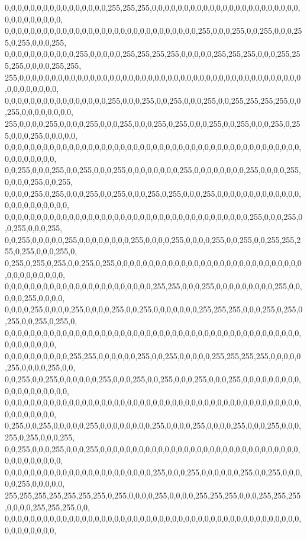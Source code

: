 \begin{DoxyCode}
      0,0,0,0,0,0,0,0,0,0,0,0,0,0,0,0,255,255,255,0,0,0,0,0,0,0,0,0,0,0,0,0,0,0,0,0,0,0,0,0,0,0,0,0,0,0,0,0,0,0,0,
      0,0,0,0,0,0,0,0,0,0,0,0,0,0,0,0,0,0,0,0,0,0,0,0,0,0,0,0,0,0,255,0,0,0,255,0,0,255,0,0,0,255,0,255,0,0,0,255,
      0,0,0,0,0,0,0,0,0,0,0,255,0,0,0,0,0,255,255,255,255,0,0,0,0,0,255,255,255,0,0,0,255,255,255,0,0,0,0,255,255,
      255,0,0,0,0,0,0,0,0,0,0,0,0,0,0,0,0,0,0,0,0,0,0,0,0,0,0,0,0,0,0,0,0,0,0,0,0,0,0,0,0,0,0,0,0,0,0,0,0,0,0,0,0,
      0,0,0,0,0,0,0,0,0,0,0,0,0,0,0,0,255,0,0,0,255,0,0,255,0,0,0,255,0,0,255,255,255,255,0,0,255,0,0,0,0,0,0,0,0,
      255,0,0,0,0,255,0,0,0,0,255,0,0,0,255,0,0,0,255,0,255,0,0,0,255,0,0,255,0,0,0,255,0,255,0,0,0,255,0,0,0,0,0,
      0,0,0,0,0,0,0,0,0,0,0,0,0,0,0,0,0,0,0,0,0,0,0,0,0,0,0,0,0,0,0,0,0,0,0,0,0,0,0,0,0,0,0,0,0,0,0,0,0,0,0,0,0,0,
      0,0,255,0,0,0,255,0,0,255,0,0,0,255,0,0,0,0,0,0,0,0,255,0,0,0,0,0,0,0,0,255,0,0,0,0,255,0,0,0,0,255,0,0,255,
      0,0,0,0,255,0,255,0,0,0,255,0,0,255,0,0,0,255,0,255,0,0,0,255,0,0,0,0,0,0,0,0,0,0,0,0,0,0,0,0,0,0,0,0,0,0,0,
      0,0,0,0,0,0,0,0,0,0,0,0,0,0,0,0,0,0,0,0,0,0,0,0,0,0,0,0,0,0,0,0,0,0,0,0,0,0,255,0,0,0,255,0,0,255,0,0,0,255,
      0,0,255,0,0,0,0,0,255,0,0,0,0,0,0,0,0,255,0,0,0,0,255,0,0,0,0,255,0,0,255,0,0,255,255,255,0,255,0,0,0,255,0,
      0,255,0,255,0,255,0,0,255,0,255,0,0,0,0,0,0,0,0,0,0,0,0,0,0,0,0,0,0,0,0,0,0,0,0,0,0,0,0,0,0,0,0,0,0,0,0,0,0,
      0,0,0,0,0,0,0,0,0,0,0,0,0,0,0,0,0,0,0,0,0,0,0,255,255,0,0,0,255,0,0,0,0,0,0,0,0,0,255,0,0,0,0,0,255,0,0,0,0,
      0,0,0,0,255,0,0,0,0,255,0,0,0,0,255,0,0,255,0,0,0,0,0,0,0,255,255,255,0,0,0,255,0,255,0,255,0,0,255,0,255,0,
      0,0,0,0,0,0,0,0,0,0,0,0,0,0,0,0,0,0,0,0,0,0,0,0,0,0,0,0,0,0,0,0,0,0,0,0,0,0,0,0,0,0,0,0,0,0,0,0,0,0,0,0,0,0,
      0,0,0,0,0,0,0,0,0,0,255,255,0,0,0,0,0,0,255,0,0,255,0,0,0,0,0,255,255,255,255,0,0,0,0,0,255,0,0,0,0,255,0,0,
      0,0,255,0,0,255,0,0,0,0,0,0,255,0,0,0,255,0,0,255,0,0,0,255,0,0,0,255,0,0,0,0,0,0,0,0,0,0,0,0,0,0,0,0,0,0,0,
      0,0,0,0,0,0,0,0,0,0,0,0,0,0,0,0,0,0,0,0,0,0,0,0,0,0,0,0,0,0,0,0,0,0,0,0,0,0,0,0,0,0,0,0,0,0,0,0,0,0,0,0,0,0,
      0,255,0,0,255,0,0,0,0,0,255,0,0,0,0,0,0,0,0,255,0,0,0,0,255,0,0,0,0,255,0,0,0,255,0,0,0,255,0,255,0,0,0,255,
      0,0,255,0,0,0,255,0,0,0,255,0,0,0,0,0,0,0,0,0,0,0,0,0,0,0,0,0,0,0,0,0,0,0,0,0,0,0,0,0,0,0,0,0,0,0,0,0,0,0,0,
      0,0,0,0,0,0,0,0,0,0,0,0,0,0,0,0,0,0,0,0,0,0,0,255,0,0,0,255,0,0,0,0,0,0,255,0,0,255,0,0,0,0,0,255,0,0,0,0,0,
      255,255,255,255,255,255,255,0,255,0,0,0,0,255,0,0,0,0,255,255,255,0,0,0,255,255,255,0,0,0,0,255,255,255,0,0,
      0,0,0,0,0,0,0,0,0,0,0,0,0,0,0,0,0,0,0,0,0,0,0,0,0,0,0,0,0,0,0,0,0,0,0,0,0,0,0,0,0,0,0,0,0,0,0,0,0,0,0,0,0,0,

\end{DoxyCode}
